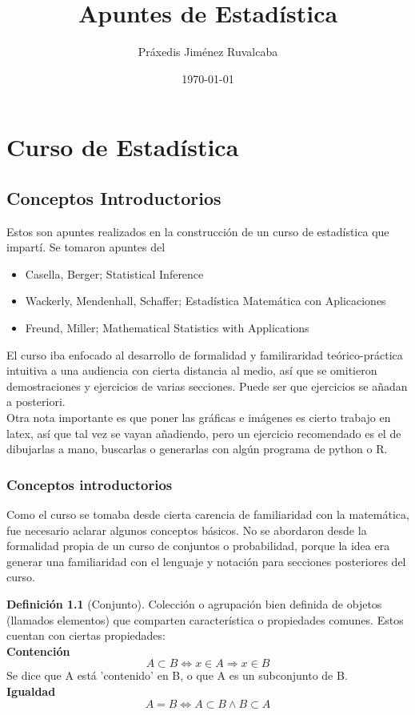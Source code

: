 \documentclass[11pt,a4paper,oneside]{report}
\title{Apuntes de Estadística}
\author{Práxedis Jiménez Ruvalcaba}
\date{\today}
\theoremstyle{definition}
\newtheorem{definicion}{Definición}[chapter]
\theoremstyle{plain}
\theoremstyle{remark}
\begin{document}
\maketitle
\tableofcontents

\part{Curso de Estadística}

\chapter{Conceptos Introductorios}
Estos son apuntes realizados en la construcción de un curso de estadística que impartí. Se tomaron apuntes del
\begin{itemize}
  \item Casella, Berger; Statistical Inference
  \item Wackerly, Mendenhall, Schaffer; Estadística Matemática con Aplicaciones
  \item Freund, Miller; Mathematical Statistics with Applications
\end{itemize}

El curso iba enfocado al desarrollo de formalidad y familiraridad teórico-práctica intuitiva a una audiencia 
con cierta distancia al medio, así que se omitieron demostraciones y ejercicios de varias secciones. Puede ser que
ejercicios se añadan a posteriori.\\
Otra nota importante es que poner las gráficas e imágenes es cierto trabajo en latex, así que tal vez se vayan
añadiendo, pero un ejercicio recomendado es el de dibujarlas a mano, buscarlas o generarlas con algún programa
de python o R.

\section{Conceptos introductorios}

Como el curso se tomaba desde cierta carencia de familiaridad con la matemática, fue necesario aclarar algunos
conceptos básicos. No se abordaron desde la formalidad propia de un curso de conjuntos o probabilidad, porque 
la idea era generar una familiaridad con el lenguaje y notación para secciones posteriores del curso.

\begin{definicion}[Conjunto]
  Colección o agrupación bien definida de objetos (llamados elementos) que comparten característica o
  propiedades comunes. Estos cuentan con ciertas propiedades:\\
  \textbf{Contención}
  \[A\subset B \iff x \in A \Rightarrow x \in B\]
  Se dice que A está 'contenido' en B, o que A es un subconjunto de B.\\
  \textbf{Igualdad}
  \[ A = B \iff A \subset B \wedge B \subset A \]
\end{definicion}
\end{document}
